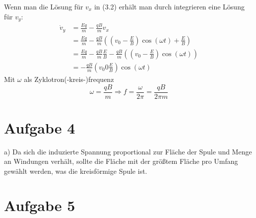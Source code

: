 \documentclass[11pt a4paper]{article}
\begin{document}
\newpage
Wenn man die Lösung für $v_x$ in (3.2) erhält man durch integrieren eine
Lösung für $v_y$:
\begin{align*}
	\dot v_y &= \frac{Eq}{m} - \frac{qB}{m} v_x \\
	&= \frac{Eq}{m} - \frac{qB}{m} \left(
		\left( v_0 - \frac EB \right) \cos(\omega t) + \frac EB
		\right) \\
	&= \frac{Eq}{m} - \frac{qB}{m} \frac EB  - \frac{qB}{m}\left(
		\left( v_0 - \frac EB \right) \cos(\omega t)
		\right) \\
	&= -\frac{qB}{m} \left(v_0 0 \frac EB \right)
		\cos (\omega t)
\end{align*}
Mit $\omega$ als Zyklotron(-kreis-)frequenz
\[ 
	\omega = \frac{qB}{m} 
	\Rightarrow f = \frac{\omega}{2\pi} = \frac{qB}{2\pi m}
\]

\newpage

\section*{Aufgabe 4}
a) Da sich die induzierte Spannung proportional zur Fläche der Spule und 
Menge an Windungen verhält, sollte die Fläche mit der größtem Fläche pro
Umfang gewählt werden, was die kreisförmige Spule ist.

\newpage
\section*{Aufgabe 5}
\newpage
\end{document}
